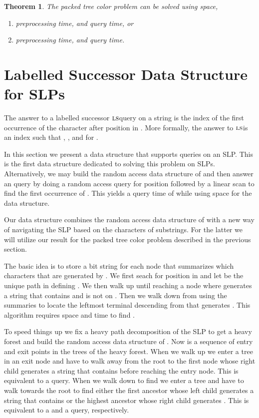\documentclass[11pt]{article}
\newcommand{\labsuc}{\ensuremath{\textsc{ls}}}
\newtheorem{theorem}{Theorem}
\begin{document}
\begin{theorem}\label{thm:PTC}
The packed tree color problem can be solved using  space,
\begin{enumerate}
	\item[\textit{(i)}]  preprocessing time, and  query time, or
	\item[\textit{(ii)}]  preprocessing time, and  query time.
\end{enumerate}
\end{theorem}


\section{Labelled Successor Data Structure for SLPs}
The answer to a labelled successor \labsuc query on a string  is the index of the first occurrence of the character  after position  in . More formally, the answer to \labsuc is an index  such that , , and  for . 

In this section we present a data structure that supports  queries on an SLP.  This is the first data structure dedicated to solving this problem on SLPs. Alternatively, we may build the random access data structure of \cite{bille2011random} and then answer an  query by doing a random access query for position  followed by a linear scan to find the first occurrence of . This yields a query time of  while using  space for the data structure. 

Our data structure combines the random access data structure of \cite{bille2011random} with a new way of navigating the SLP based on the characters of substrings. For the latter we will utilize our result for the packed tree color problem described in the previous section.

The basic idea is to store a bit string for each node  that summarizes which characters that are generated by . We first seach for position  in  and let  be the unique path in  defining . We then walk up  until reaching a node  where  generates a string that contains  and  is not on . Then we walk down from  using the summaries to locate the leftmost terminal descending from  that generates . This algorithm requires  space and  time to find .

To speed things up we fix a heavy path decomposition of the SLP to get a heavy forest and build the random access data structure of \cite{bille2011random}. Now  is a sequence of entry and exit points in the trees of the heavy forest. When we walk up  we enter a tree in an exit node and have to walk away from the root to the first node whose right child generates a string that contains  before reaching the entry node. This is equivalent to a  query. When we walk down to find  we enter a tree and have to walk towards the root to find either the first ancestor whose left child generates a string that contains  or the highest ancestor whose right child generates . This is equivalent to a  and a  query, respectively.
\end{document}

